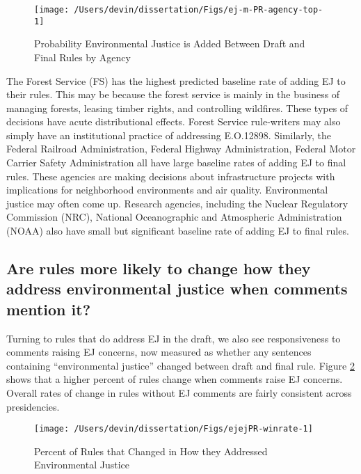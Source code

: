 \documentclass[
      12pt,
        ]{article}
\begin{document}
\begin{figure}

{\centering \texttt{[image: /Users/devin/dissertation/Figs/ej-m-PR-agency-top-1]} 

}

\caption{Probability Environmental Justice is Added Between Draft and Final Rules by Agency}\label{fig:ej-m-PR-agency-top}
\end{figure}

The Forest Service (FS) has the highest predicted baseline rate of adding EJ to their rules. This may be because the forest service is mainly in
the business of managing forests, leasing timber rights, and controlling
wildfires. These types of decisions have acute distributional
effects. Forest Service rule-writers may also simply have an institutional practice of addressing E.O.12898.
Similarly, the Federal
Railroad Administration, Federal Highway
Administration, Federal Motor Carrier Safety Administration all have large baseline rates of adding EJ to final rules. These agencies are
making decisions about infrastructure projects with implications for
neighborhood environments and air quality. Environmental justice may
often come up.
Research agencies, including the Nuclear Regulatory Commission (NRC), National Oceanographic and Atmospheric Administration (NOAA) also have small but significant baseline rate of adding EJ to final rules.

\hypertarget{are-rules-more-likely-to-change-how-they-address-environmental-justice-when-comments-mention-it}{%
\subsection{Are rules more likely to change how they address environmental justice when comments mention it?}\label{are-rules-more-likely-to-change-how-they-address-environmental-justice-when-comments-mention-it}}

Turning to rules that do address EJ in the draft, we also see responsiveness to comments raising EJ concerns, now measured as whether any sentences containing ``environmental justice'' changed between draft and final rule.
Figure \ref{fig:ejejPR-winrate-1} shows that a higher percent of rules change when comments raise EJ concerns. Overall rates of change in rules without EJ comments are fairly consistent across presidencies.

\begin{figure}

{\centering \texttt{[image: /Users/devin/dissertation/Figs/ejejPR-winrate-1]} 

}

\caption{Percent of Rules that Changed in How they Addressed Environmental Justice}\label{fig:ejejPR-winrate-1}
\end{figure}
\end{document}
